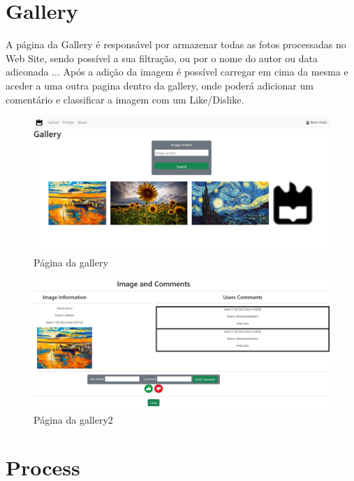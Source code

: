 \documentclass{report}
\begin{document}
\section{Gallery}

    A página da Gallery é responsável por armazenar todas as fotos processadas no Web Site, sendo possível a sua filtração, ou por o nome do autor ou data adiconada ...
    Após a adição da imagem é possível carregar em cima da mesma e aceder a uma outra pagina dentro da gallery, onde poderá adicionar um comentário e classificar a imagem com um Like/Dislike.\\ [5pt]



\begin{figure}[h]
    \centering
    \includegraphics[width=\textwidth]{gallery.jpg}
    \caption{Página da gallery}
\end{figure}


\begin{figure}[h]
    \centering
    \includegraphics[width=\textwidth]{gallery2.jpg}
    \caption{Página da gallery2} 
\end{figure} 

\section{Process}
\end{document}
